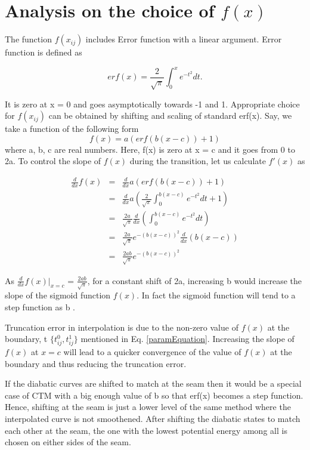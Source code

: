 \chapter{Analysis on the choice of $f(x)$}

The function $f(x_{ij})$ includes Error function with a linear argument. Error function is defined as

\begin{equation}
erf(x) = \frac{2}{\sqrt{\pi}} \int_0^x e^{-t^{2}} dt.
\label{erfDefinition}
\end{equation}

It is zero at x = 0 and goes asymptotically towards -1 and 1. Appropriate choice for
$f(x_{ij})$ can be obtained by shifting and scaling of standard erf(x). Say, we take
a function of the following form
\begin{equation}
f(x) = a(erf(b(x-c)) + 1)
\label{fx_function}
\end{equation}
where a, b, c are real numbers. Here, f(x) is zero at x = c and it goes from 0 to 2a. To
control the slope of $f(x)$ during the transition, let us calculate $f'(x)$ as

\begin{eqnarray}
\frac{d}{dx}f(x) & = & \frac{d}{dx}a(erf(b(x-c)) + 1)\\
&  = & \frac{d}{dx}a(\frac{2}{\sqrt{\pi}} \int_0^{b(x-c)} e^{-t^{2}} dt + 1)\\
&  = & \frac{2a}{\sqrt{\pi}} \frac{d}{dx}(\int_0^{b(x-c)} e^{-t^{2}} dt)\\
&  = & \frac{2a}{\sqrt{\pi}} e^{-(b(x-c))^{2}} \frac{d}{dx}({b(x-c)})\\
&  = & \frac{2ab}{\sqrt{\pi}} e^{-(b(x-c))^{2}}
\end{eqnarray}

As $\frac{d}{dx}f(x)|_{x = c}$ = $\frac{2ab}{\sqrt{\pi}}$, for a constant shift of 2a,
increasing b would increase the slope of the sigmoid function $f(x)$. In fact the sigmoid
function will tend to a step function as b \to \infty.

Truncation error in interpolation is due to the non-zero value of $f(x)$ at the
boundary, t \in $\{t_{ij}^{0},t_{ij}^{1}\}$ mentioned in Eq. \ref{paramEquation}.
Increasing the slope of $f(x)$ at $x=c$ will lead to a quicker convergence of the value
of $f(x)$ at the boundary and thus reducing the truncation error.

If the diabatic curves are shifted to match at the seam then it would be
a special case of CTM with a big enough value of b so that erf(x) becomes a step
function. Hence, shifting at the seam is just a lower level of the same
method where the interpolated curve is not smoothened. After shifting the diabatic
states to match each other at the seam, the one with the lowest potential
energy among all is chosen on either sides of the seam.
\newpage
